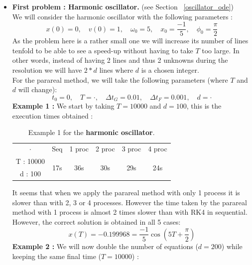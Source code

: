 \begin{enumerate}[label=\textbullet]
	\begin{itemize}[label=-]
		\item \textbf{First problem : Harmonic oscillator.} (see Section ~\ref{oscillator_ode}) \\
		We will consider the harmonic oscillator with the following parameters :
		$$x(0) = 0, \quad v(0) = 1, \quad \omega_0 = 5, \quad x_0 = \frac{-1}{5}, \quad \phi_0 = \frac{\pi}{2}$$
		As the problem here is a rather small one we will increase its number of lines tenfold to be able to see a speed-up without having to take $T$ too large. In other words, instead of having 2 lines and thus 2 unknowns during the resolution we will have $2*d$ lines where $d$ is a chosen integer. \\
		For the parareal method, we will take the following parameters (where $T$ and $d$ will change):
		$$t_0=0, \quad T=\cdot, \quad \Delta t_G=0.01, \quad \Delta t_F=0.001, \quad d=\cdot$$
		\textbf{Example 1 :} We start by taking $T=10000$ and $d=100$, this is the execution times obtained :
		\renewcommand{\arraystretch}{1.2}
		\begin{table}[H]
			\centering
			\begin{tabular}{| c || c | c | c | c | c |}
				\hline
				\multirow{2}{1.5 cm}{$\cdot$} & \multirow{2}{1.5 cm}{Seq} & \multirow{2}{1.5 cm}{1 proc} & \multirow{2}{1.5 cm}{2 proc} & \multirow{2}{1.5 cm}{3 proc} &\multirow{2}{1.5 cm}{4 proc} \\
				& & & & & \\
				\hline 
				T : 10000 & \multirow{2}{1.5 cm}{17s} & \multirow{2}{1.5 cm}{36s} & \multirow{2}{1.5 cm}{30s} & \multirow{2}{1.5 cm}{29s} & \multirow{2}{1.5 cm}{24s} \\
				d : 100 & & & & & \\
				\hline 
			\end{tabular}
			\caption{Example 1 for the \textbf{harmonic oscillator}.}
			\label{time_osc_1}
		\end{table}
		It seems that when we apply the parareal method with only 1 process it is slower than with 2, 3 or 4 processes. However the time taken by the parareal method with 1 process is almost 2 times slower than with RK4 in sequential. However, the correct solution is obtained in all 5 cases:
		$$x(T)=-0.199968=\frac{-1}{5}\cos\left(5T+\frac{\pi}{2}\right)$$
		\textbf{Example 2 :} We will now double the number of equations ($d=200$) while keeping the same final time ($T=10000$) :
		\begin{table}[H]
			\centering
			\begin{tabular}{| c || c | c | c | c | c |}

\end{tabular}
\end{table}
\end{itemize}
\end{enumerate}
